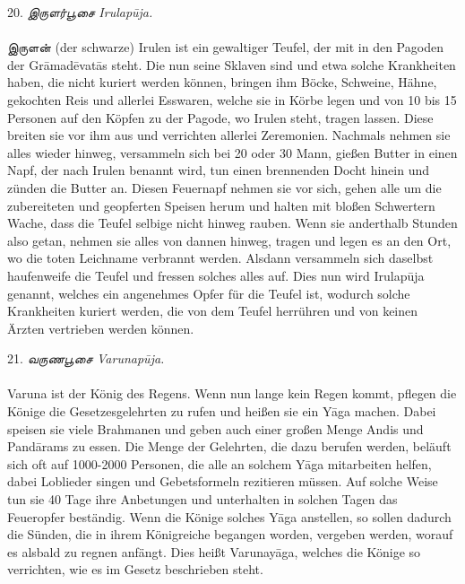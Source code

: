 \documentclass{article}
\newcommand{\TamilText}[1]{\texttamil{#1}}
\newcommand{\tam}[1]{\TamilText{#1}}
\begin{document}
\begin{center}
20. \emph{\tam{இருளர்பூசை} Irulap\={u}ja.}
\end{center}
\paragraph{}
\tam{இருளன்} (der schwarze) Irulen ist ein gewaltiger Teufel, der mit in den Pagoden der Gr\={a}mad\={e}vat\={a}s steht. Die nun seine Sklaven sind und etwa solche Krankheiten haben, die nicht kuriert werden können, bringen ihm Böcke, Schweine, Hähne, gekochten Reis und allerlei Esswaren, welche sie in Körbe legen und von 10 bis 15 Personen auf den Köpfen zu der Pagode, wo Irulen steht, tragen lassen. Diese breiten sie vor ihm aus und verrichten allerlei Zeremonien. Nachmals nehmen sie alles wieder hinweg, versammeln sich bei 20 oder 30 Mann, gießen Butter in einen Napf, der nach Irulen benannt wird, tun einen brennenden Docht hinein und zünden die Butter an. Diesen Feuernapf nehmen sie vor sich, gehen alle um die zubereiteten und geopferten Speisen herum und halten mit bloßen Schwertern Wache, dass die Teufel selbige nicht hinweg rauben. Wenn sie anderthalb Stunden also getan, nehmen sie alles von dannen hinweg, tragen und legen es an den Ort, wo die toten Leichname verbrannt werden. Alsdann versammeln sich daselbst haufenweife die Teufel und fressen solches alles auf. Dies nun wird Irulap\={u}ja genannt, welches ein angenehmes Opfer für die Teufel ist, wodurch solche Krankheiten kuriert werden, die von dem Teufel herrühren und von keinen Ärzten vertrieben werden können.

\begin{center}
21. \emph{\tam{வருணபூசை} Varunap\={u}ja.}
\end{center}
\paragraph{}
Varuna ist der König des Regens. Wenn nun lange kein Regen kommt, pflegen die Könige die Gesetzesgelehrten zu rufen und heißen sie ein Y\={a}ga machen. Dabei speisen sie viele Brahmanen und geben auch einer großen Menge Andis und Pand\={a}rams zu essen. Die Menge der Gelehrten, die dazu berufen werden, beläuft sich oft auf 1000-2000 Personen, die alle an solchem Y\={a}ga mitarbeiten helfen, dabei Loblieder singen und Gebetsformeln rezitieren müssen. Auf solche Weise tun sie 40 Tage ihre Anbetungen und unterhalten in solchen Tagen das Feueropfer beständig. Wenn die Könige solches Y\={a}ga anstellen, so sollen dadurch die Sünden, die in ihrem Königreiche begangen worden, vergeben werden, worauf es alsbald zu regnen anfängt. Dies heißt Varunay\={a}ga, welches die Könige so verrichten, wie es im Gesetz beschrieben steht.
\end{document}
